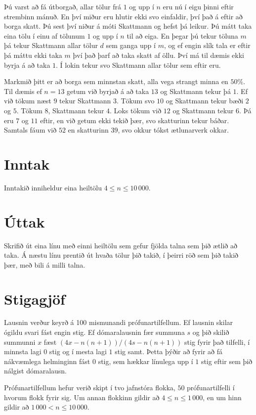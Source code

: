 
Þú varst að fá útborgað, allar tölur frá $1$ og upp í $n$ eru nú í eigu þinni
eftir strembinn mánuð. En því miður eru hlutir ekki svo einfaldir, því það á
eftir að borga skatt. Þú sest því niður á móti Skattmann og hefst þá
leikur. Þú mátt taka eina tölu í einu af tölunum $1$ og upp í $n$ til að
eiga. En þegar þú tekur töluna $m$ þá tekur Skattmann allar
tölur $d$ sem ganga upp í $m$, og ef engin slík tala er eftir þá máttu ekki
taka $m$ því það þarf að taka skatt af öllu. Því má til dæmis ekki byrja á
að taka $1$. Í lokin tekur svo Skattmann allar tölur sem eftir eru.

Markmið þitt er að borga sem minnstan skatt, alla vega strangt minna en $50\%$.
Til dæmis ef $n = 13$ getum við byrjað á að taka $13$ og Skattmann tekur
þá $1$. Ef við tökum næst $9$ tekur Skattmann $3$. Tökum svo $10$ og
Skattmann tekur bæði $2$ og $5$. Tökum $8$, Skattmann tekur $4$.
Loks tökum við $12$ og Skattmann tekur $6$. Þá eru $7$ og $11$ eftir,
en við getum ekki tekið þær, svo skatturinn tekur báðar. Samtals fáum við
$52$ en skatturinn $39$, svo okkur tókst ætlunarverk okkar.

\section*{Inntak}
Inntakið inniheldur eina heiltölu $4 \leq n \leq 10\,000$.

\section*{Úttak}
Skrifið út eina línu með einni heiltölu sem gefur fjölda talna sem þið ætlið að taka.
Á næstu línu prentið út hvaða tölur þið takið, í þeirri röð sem þið takið þær, með bili á
milli talna.

\section*{Stigagjöf}
Lausnin verður keyrð á 100 mismunandi prófunartilfellum. Ef lausnin skilar
ógildu svari fást engin stig. Ef dómaralausnin fær summuna $s$ og þið skilið summunni
$x$ fæst $(4x - n(n + 1)) / (4s - n(n + 1))$ stig fyrir það tilfelli, í minnsta lagi $0$
stig og í mesta lagi $1$ stig samt. Þetta þýðir að fyrir að fá nákvæmlega helminginn fást $0$
stig, sem hækkar línulega upp í $1$ stig eftir sem þið nálgist dómaralausn.

Prófunartilfellum hefur verið skipt í tvo jafnstóra flokka, $50$ prófunartilfelli í hvorum flokk fyrir sig.
Um annan flokkinn gildir að $4 \leq n \leq 1\,000$, en um hinn gildir að $1\,000 < n \leq 10\,000$.
